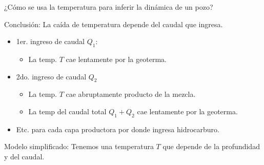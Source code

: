 \documentclass[presentation]{beamer}
\begin{document}
\begin{frame}{¿Cómo se usa la temperatura para inferir la dinámica de un pozo?}
	\begin{block}{Conclusión:}
		La caída de temperatura depende del caudal que ingresa. 
	\end{block}
\begin{itemize}
	\item 1er. ingreso de caudal $Q_1$:
	\begin{itemize}
		\item La temp. $T$ cae lentamente por la geoterma.
	\end{itemize}
	\item 2do. ingreso de caudal $Q_2$
		\begin{itemize}
		\item La temp. $T$ cae abruptamente producto de la mezcla.
		\item La temp del caudal total $Q_1+Q_2$ cae lentamente por la geoterma.
	\end{itemize}
	\item Etc. para cada capa productora por donde ingresa hidrocarburo.	
\end{itemize}

\begin{block}{Modelo simplificado:}
	Tenemos una temperatura $T$ que depende de la profundidad y del caudal. 
\end{block}

\end{frame}
\end{document}
